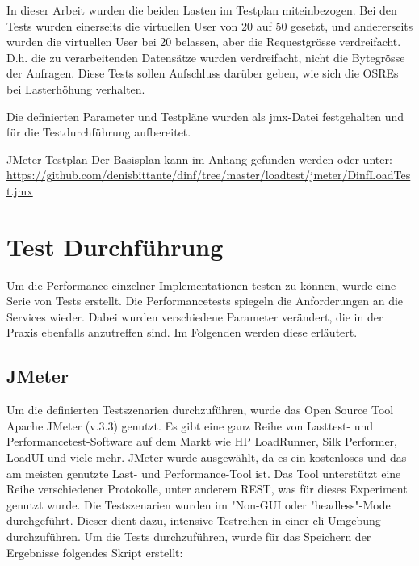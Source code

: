 \documentclass[main.tex]{subfiles}
\begin{document}
In dieser Arbeit wurden die beiden Lasten im Testplan miteinbezogen. Bei den Tests wurden einerseits die virtuellen User von 20 auf 50 gesetzt, und andererseits wurden die virtuellen User bei 20 belassen, aber die Requestgrösse verdreifacht. D.h. die zu verarbeitenden Datensätze wurden verdreifacht, nicht die Bytegrösse der Anfragen. Diese Tests sollen Aufschluss darüber geben, wie sich die OSREs bei Lasterhöhung verhalten.

Die definierten Parameter und Testpläne wurden als jmx-Datei festgehalten und für die Testdurchführung aufbereitet.

\begin{reference}{JMeter Testplan}
Der Basisplan kann im Anhang gefunden werden oder unter: 
 \url{https://github.com/denisbittante/dinf/tree/master/loadtest/jmeter/DinfLoadTest.jmx}
 
\end{reference}



\section{Test Durchführung}


Um die Performance einzelner Implementationen testen zu können, wurde eine Serie von Tests erstellt. Die Performancetests spiegeln die Anforderungen an die Services wieder. Dabei wurden verschiedene Parameter verändert, die in der Praxis ebenfalls anzutreffen sind. Im Folgenden werden diese erläutert.

\subsection{JMeter}


Um die definierten Testszenarien durchzuführen, wurde das Open Source Tool Apache JMeter (v.3.3) genutzt. Es gibt eine ganz Reihe von Lasttest- und Performancetest-Software auf dem Markt wie HP LoadRunner, Silk Performer, LoadUI und viele mehr. JMeter wurde ausgewählt, da es ein kostenloses und das am meisten genutzte Last- und Performance-Tool ist. Das Tool unterstützt eine Reihe verschiedener Protokolle, unter anderem REST, was für dieses Experiment genutzt wurde. Die Testszenarien wurden im "Non-GUI oder "headless"-Mode durchgeführt. Dieser dient dazu, intensive Testreihen in einer \acrshort{cli}-Umgebung durchzuführen. Um die Tests durchzuführen, wurde für das Speichern der Ergebnisse folgendes Skript erstellt:
\end{document}
